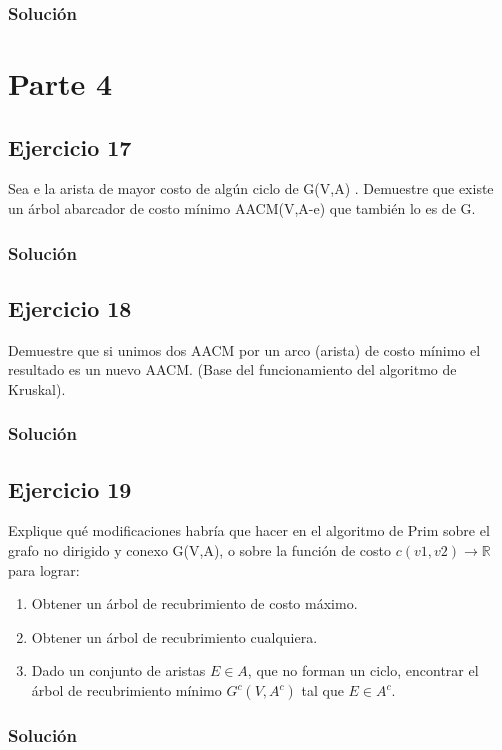 \documentclass{article}
\begin{document}
\subsubsection*{Solución}


\section*{Parte 4}
\subsection*{Ejercicio 17}
Sea e la arista de mayor costo de algún ciclo de G(V,A) . Demuestre que existe un árbol abarcador de costo mínimo AACM(V,A-e) que también lo es de G.
\subsubsection*{Solución}


\subsection*{Ejercicio 18}
Demuestre que si unimos dos AACM por un arco (arista) de costo mínimo el resultado es un nuevo AACM. (Base del funcionamiento del algoritmo de Kruskal).
\subsubsection*{Solución}


\subsection*{Ejercicio 19}
Explique qué modificaciones habría que hacer en el algoritmo de Prim sobre el grafo no dirigido y conexo G(V,A), o sobre la función de costo $c(v1,v2) \rightarrow \mathbb{R}$ para lograr:
\begin{enumerate}
    \item Obtener un árbol de recubrimiento de costo máximo.
    \item Obtener un árbol de recubrimiento cualquiera.
    \item Dado un conjunto de aristas $E \in A$, que no forman un ciclo, encontrar el árbol de recubrimiento mínimo $G^c (V,A^c)$ tal que $E \in A^c$.
\end{enumerate}
\subsubsection*{Solución}
\end{document}
